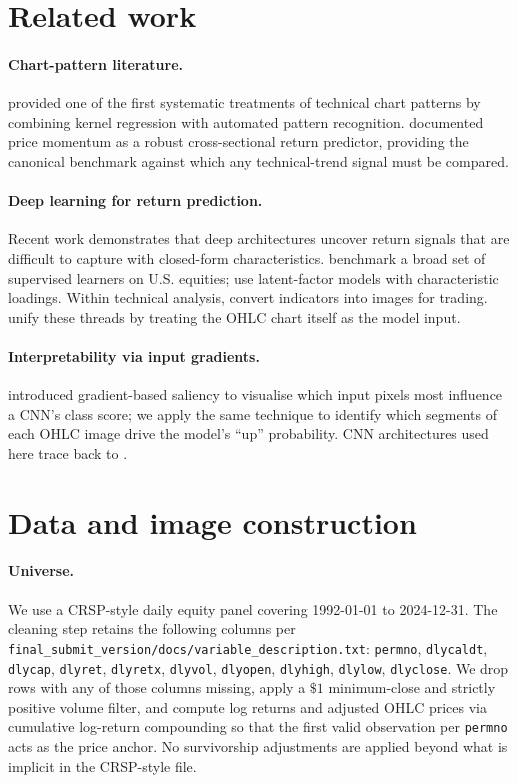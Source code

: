 \documentclass{article}
\begin{document}
\section{Related work}
\label{sec:related}

\paragraph{Chart-pattern literature.}
\citet{lo2000foundations} provided one of the first systematic treatments
of technical chart patterns by combining kernel regression with automated
pattern recognition. \citet{jegadeesh1993returns} documented price momentum
as a robust cross-sectional return predictor, providing the canonical
benchmark against which any technical-trend signal must be compared.

\paragraph{Deep learning for return prediction.}
Recent work demonstrates that deep architectures uncover return signals
that are difficult to capture with closed-form characteristics. \citet{gu2020empirical}
benchmark a broad set of supervised learners on U.S. equities;
\citet{kelly2019characteristics} use latent-factor models with characteristic
loadings. Within technical analysis, \citet{sezer2018algorithmic} convert
indicators into images for trading. \citet{jiang2023reimagining} unify these
threads by treating the OHLC chart itself as the model input.

\paragraph{Interpretability via input gradients.}
\citet{simonyan2014deep} introduced gradient-based saliency to visualise
which input pixels most influence a CNN's class score; we apply the same
technique to identify which segments of each OHLC image drive the model's
``up'' probability. CNN architectures used here trace back to
\citet{lecun1998gradient}.


\section{Data and image construction}
\label{sec:data}

\paragraph{Universe.}
We use a CRSP-style daily equity panel covering 1992-01-01 to 2024-12-31.
The cleaning step retains the following columns per
\texttt{final\_submit\_version/docs/variable\_description.txt}:
\texttt{permno}, \texttt{dlycaldt}, \texttt{dlycap}, \texttt{dlyret},
\texttt{dlyretx}, \texttt{dlyvol}, \texttt{dlyopen}, \texttt{dlyhigh},
\texttt{dlylow}, \texttt{dlyclose}. We drop rows with any of those columns
missing, apply a $\$1$ minimum-close and strictly positive
volume filter, and compute log returns and adjusted OHLC prices via
cumulative log-return compounding so that the first valid observation per
\texttt{permno} acts as the price anchor. No survivorship adjustments are
applied beyond what is implicit in the CRSP-style file.
\end{document}

